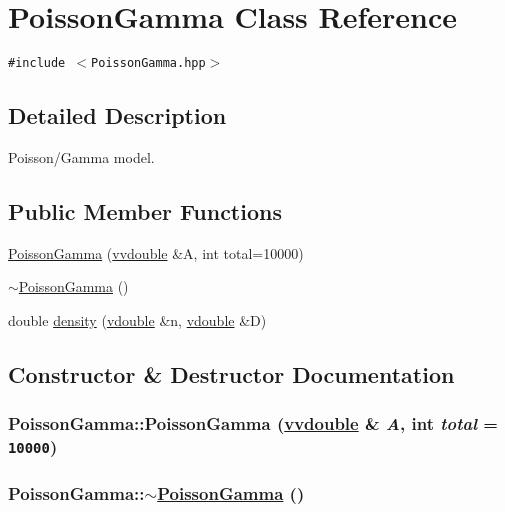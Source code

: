 \hypertarget{classPoissonGamma}{
\section{Poisson\-Gamma Class Reference}
\label{classPoissonGamma}
}
{\tt \#include $<$Poisson\-Gamma.hpp$>$}



\subsection{Detailed Description}
Poisson/Gamma model. 

\subsection*{Public Member Functions}
\begin{CompactItemize}
\item 
\hyperlink{classPoissonGamma_a0}{Poisson\-Gamma} (\hyperlink{PoissonGammaFit_8hpp_a1}{vvdouble} \&A, int total=10000)
\item 
\hyperlink{classPoissonGamma_a1}{$\sim$Poisson\-Gamma} ()
\item 
double \hyperlink{classPoissonGamma_a2}{density} (\hyperlink{PoissonGammaFit_8hpp_a0}{vdouble} \&n, \hyperlink{PoissonGammaFit_8hpp_a0}{vdouble} \&D)
\end{CompactItemize}


\subsection{Constructor \& Destructor Documentation}
\hypertarget{classPoissonGamma_a0}{
\subsubsection[PoissonGamma]{\setlength{\rightskip}{0pt plus 5cm}Poisson\-Gamma::Poisson\-Gamma (\hyperlink{PoissonGammaFit_8hpp_a1}{vvdouble} \& {\em A}, int {\em total} = {\tt 10000})}}
\label{classPoissonGamma_a0}


\hypertarget{classPoissonGamma_a1}{
\subsubsection[$\sim$PoissonGamma]{\setlength{\rightskip}{0pt plus 5cm}Poisson\-Gamma::$\sim$\hyperlink{classPoissonGamma}{Poisson\-Gamma} ()}}
\label{classPoissonGamma_a1}




